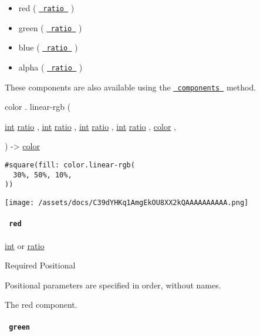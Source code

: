 \begin{itemize}
\tightlist
\item
  red ( \href{/docs/reference/layout/ratio/}{\texttt{\ ratio\ }} )
\item
  green ( \href{/docs/reference/layout/ratio/}{\texttt{\ ratio\ }} )
\item
  blue ( \href{/docs/reference/layout/ratio/}{\texttt{\ ratio\ }} )
\item
  alpha ( \href{/docs/reference/layout/ratio/}{\texttt{\ ratio\ }} )
\end{itemize}

These components are also available using the
\href{/docs/reference/visualize/color/\#definitions-components}{\texttt{\ components\ }}
method.

color { . } { linear-rgb } (

{ \href{/docs/reference/foundations/int/}{int}
\href{/docs/reference/layout/ratio/}{ratio} , } {
\href{/docs/reference/foundations/int/}{int}
\href{/docs/reference/layout/ratio/}{ratio} , } {
\href{/docs/reference/foundations/int/}{int}
\href{/docs/reference/layout/ratio/}{ratio} , } {
\href{/docs/reference/foundations/int/}{int}
\href{/docs/reference/layout/ratio/}{ratio} , } {
\href{/docs/reference/visualize/color/}{color} , }

) -\textgreater{} \href{/docs/reference/visualize/color/}{color}

\begin{verbatim}
#square(fill: color.linear-rgb(
  30%, 50%, 10%,
))
\end{verbatim}

\texttt{[image: /assets/docs/C39dYHKq1AmgEkOU8XX2kQAAAAAAAAAA.png]}

\paragraph{\texorpdfstring{\texttt{\ red\ }}{ red }}\label{definitions-linear-rgb-red}

\href{/docs/reference/foundations/int/}{int} {or}
\href{/docs/reference/layout/ratio/}{ratio}

{Required} {{ Positional }}

\label{definitions-linear-rgb-red-positional-tooltip}
Positional parameters are specified in order, without names.

The red component.

\paragraph{\texorpdfstring{\texttt{\ green\ }}{ green }}\label{definitions-linear-rgb-green}

